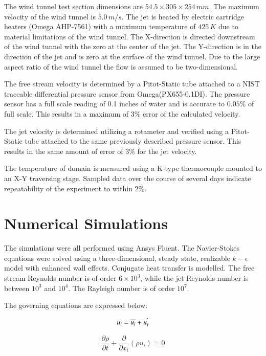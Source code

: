 \documentclass[preprint,12pt]{elsarticle}
\begin{document}
The wind tunnel test section dimensions are $54.5\times305\times 254\,mm$.  The maximum velocity of the wind tunnel is $5.0\,m/s$.  The jet is heated by electric cartridge heaters (Omega AHP-7561) with a maximum temperature of $425\,K$ due to material limitations of the wind tunnel.  The X-direction is directed downstream of the wind tunnel with the zero at the center of the jet.  The Y-direction is in the direction of the jet and is zero at the surface of the wind tunnel.  Due to the large aspect ratio of the wind tunnel the flow is assumed to be two-dimensional.

The free stream velocity is determined by a Pitot-Static tube attached to a NIST traceable differential pressure sensor from Omega(PX655-0.1DI).  The pressure sensor has a full scale reading of 0.1 inches of water and is accurate to $0.05\%$ of full scale.  This results in a maximum of $3\%$ error of the calculated velocity.

The jet velocity is determined utilizing a rotameter and verified using a Pitot-Static tube attached to the same previously described pressure sensor.  This results in the same amount of error of $3\%$ for the jet velocity.

The temperature of domain is measured using a K-type thermocouple mounted to an X-Y traversing stage.  Sampled data over the course of several days indicate repeatability of the experiment to within $2\%$.

\section{Numerical Simulations}
The simulations were all performed using Ansys Fluent\cite{fluentsoftware}.  The Navier-Stokes equations were solved using a three-dimensional, steady state, realizable $k-\epsilon$ model with enhanced wall effects.  Conjugate heat transfer is modelled.  The free stream Reynolds number is of order $6\times10^3$, while the jet Reynolds number is between $10^3$ and $10^4$.  The Rayleigh number is of order $10^7$.

The governing equations are expressed below:

\begin{equation}
\centering
u_i = \overline{u_i} + u^{'}_{i}
\label{eq:veldecomp}
\end{equation}

\begin{equation}
\frac{\partial \rho }{\partial t } + \frac{\partial }{\partial x_i} \left( \rho u_i \right) = 0 
\label{eq:mass}
\end{equation}
\end{document}

